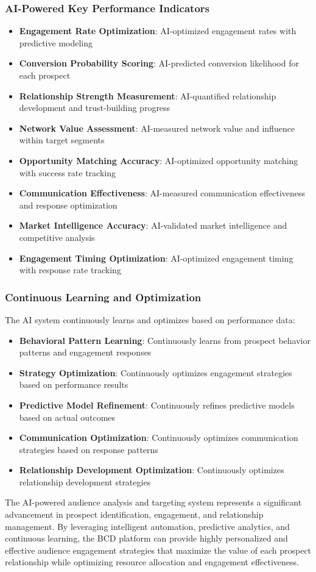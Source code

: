 \subsubsection{AI-Powered Key Performance Indicators}

\begin{itemize}
    \item \textbf{Engagement Rate Optimization}: AI-optimized engagement rates with predictive modeling
    \item \textbf{Conversion Probability Scoring}: AI-predicted conversion likelihood for each prospect
    \item \textbf{Relationship Strength Measurement}: AI-quantified relationship development and trust-building progress
    \item \textbf{Network Value Assessment}: AI-measured network value and influence within target segments
    \item \textbf{Opportunity Matching Accuracy}: AI-optimized opportunity matching with success rate tracking
    \item \textbf{Communication Effectiveness}: AI-measured communication effectiveness and response optimization
    \item \textbf{Market Intelligence Accuracy}: AI-validated market intelligence and competitive analysis
    \item \textbf{Engagement Timing Optimization}: AI-optimized engagement timing with response rate tracking
\end{itemize}

\subsubsection{Continuous Learning and Optimization}

The AI system continuously learns and optimizes based on performance data:

\begin{itemize}
    \item \textbf{Behavioral Pattern Learning}: Continuously learns from prospect behavior patterns and engagement responses
    \item \textbf{Strategy Optimization}: Continuously optimizes engagement strategies based on performance results
    \item \textbf{Predictive Model Refinement}: Continuously refines predictive models based on actual outcomes
    \item \textbf{Communication Optimization}: Continuously optimizes communication strategies based on response patterns
    \item \textbf{Relationship Development Optimization}: Continuously optimizes relationship development strategies
\end{itemize}

The AI-powered audience analysis and targeting system represents a significant advancement in prospect identification, engagement, and relationship management. By leveraging intelligent automation, predictive analytics, and continuous learning, the BCD platform can provide highly personalized and effective audience engagement strategies that maximize the value of each prospect relationship while optimizing resource allocation and engagement effectiveness. 